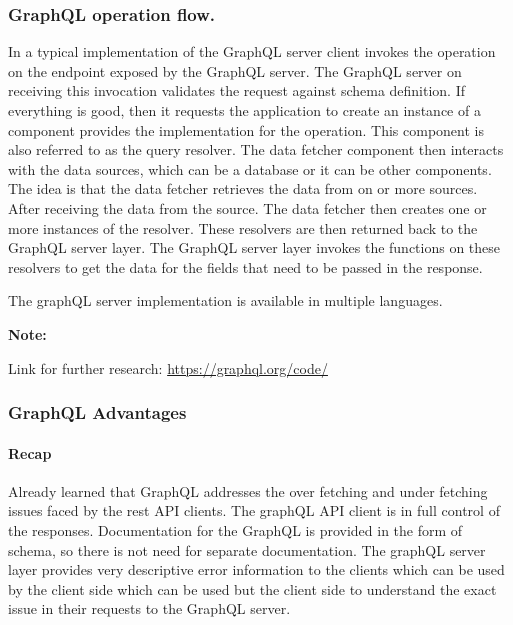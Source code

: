 \documentclass[a4paper, 11pt]{book}
\newenvironment{note}{
    \begin{siderule}
        \textbf{Note: }
        }{
    \end{siderule}
}
\begin{document}
    \subsubsection{GraphQL operation flow.}
    In a typical implementation of the GraphQL server client invokes the operation on the endpoint exposed by the GraphQL server.
    The GraphQL server on receiving this invocation validates the request against schema definition.
    If everything is good, then it requests the application to create an instance of a component provides the implementation for the operation.
    This component is also referred to as the query resolver.
    The data fetcher component then interacts with the data sources, which can be a database or it can be other components.
    The idea is that the data fetcher retrieves the data from on or more sources.
    After receiving the data from the source.
    The data fetcher then creates one or more instances of the resolver.
    These resolvers are then returned back to the GraphQL server layer.
    The GraphQL server layer invokes the functions on these resolvers to get the data for the fields that need to be passed in the response.

    The graphQL server implementation is available in multiple languages.
    \begin{note}
        Link for further research: \href{https://graphql.org/code/}{https://graphql.org/code/}
    \end{note}

    \subsubsection{GraphQL Advantages}

    \paragraph{Recap}
    Already learned that GraphQL addresses the over fetching and under fetching issues faced by the rest API clients.
    The graphQL API client is in full control of the responses.
    Documentation for the GraphQL is provided in the form of schema, so there is not need for separate documentation.
    The graphQL server layer provides very descriptive error information to the clients which can be used by the client side which can be used but the client side to understand the exact issue in their requests to the GraphQL server.
\end{document}
